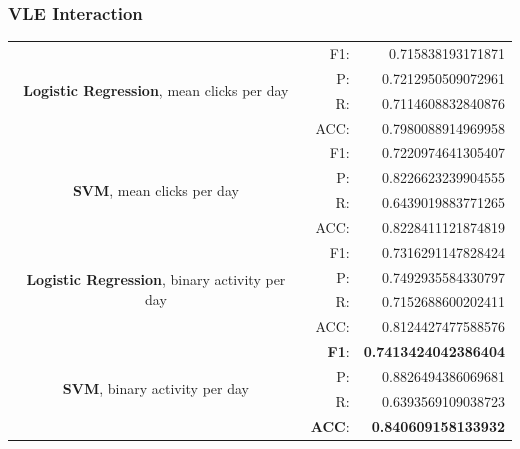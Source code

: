 \documentclass{article}
\begin{document}
\subsubsection{VLE Interaction}
\begin{center}
\begin{tabular}{|c|rr|}
\hline
\multirow{4}{10cm}{\textbf{Logistic Regression}, mean clicks per day}
&F1:&  0.715838193171871\\
&P:&   0.7212950509072961\\
&R:&   0.7114608832840876\\
&ACC:& 0.7980088914969958\\
\hline
\multirow{4}{10cm}{\textbf{SVM}, mean clicks per day}
&F1:&  0.7220974641305407 \\
&P:&   0.8226623239904555 \\
&R:&   0.6439019883771265 \\
&ACC:& 0.8228411121874819 \\
\hline
\multirow{4}{10cm}{\textbf{Logistic Regression}, binary activity per day}
&F1:&  0.7316291147828424\\
&P:&   0.7492935584330797\\
&R:&   0.7152688600202411\\
&ACC:& 0.8124427477588576\\
\hline
\multirow{4}{10cm}{\textbf{SVM}, binary activity per day}
&\textbf{F1}:&  \textbf{0.7413424042386404} \\
&P:&   0.8826494386069681 \\
&R:&   0.6393569109038723 \\
&\textbf{ACC}:& \textbf{0.840609158133932} \\
\hline
\end{tabular}
\end{center}

\pagebreak[4]
\end{document}
